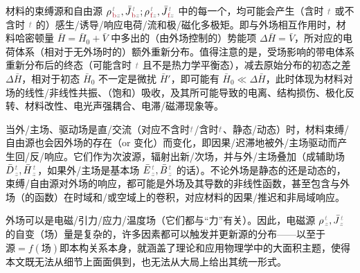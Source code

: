 材料的束缚源和自由源 ${\rho}^{\;\!\mathcolor{gray}{t}}_{\;\!\textcolor{Maroon}{\text{b}}\mathcolor{gray}{z}}, \bar{J}^{\;\!\mathcolor{gray}{t}}_{\;\!\textcolor{Maroon}{\text{b}}\mathcolor{gray}{z}};{\rho}^{\;\!\mathcolor{gray}{t}}_{\;\!\textcolor{Maroon}{\text{f}}\mathcolor{gray}{z}}, \bar{J}^{\;\!\mathcolor{gray}{t}}_{\;\!\textcolor{Maroon}{\text{f}}\mathcolor{gray}{z}}$ 中的每一个，均可能会产生（含时 $\mathcolor{gray}{t}$ 或不含时 $\mathcolor{gray}{t}$ 的）感生/诱导/响应电荷/流\cite{markelExternalInducedFree2018,raabMultipoleTheoryElectromagnetism2004,tsukermanPolarizationArbitraryCharge2021a}和极/磁化多极矩。即与外场相互作用时，材料哈密顿量 $\bar{H} = \bar{H}_0 + \bar{V}$ 中多出的（由外场控制的）势能项 $\Delta \bar{H} = \bar{V}$\cite{boydNonlinearOptics2019,raabMultipoleTheoryElectromagnetism2004}，所对应的电荷体系（相对于无外场时的）额外重新分布。值得注意的是，受场影响的带电体系重新分布后的终态（可能含时 $\mathcolor{gray}{t}$ 且不是热力学平衡态），减去原始分布的初态之差 $\Delta \bar{H}$，相对于初态 $\bar{H}_0$ 不一定是微扰 $\bar{H}'$\cite{boydNonlinearOptics2019}，即可能有 $\bar{H}_0 \ll \Delta \bar{H}$，此时体现为材料对场的线性/非线性共振、（饱和）吸收，及其所可能导致的电离\cite{boydNonlinearOptics2019}、结构损伤、极化反转、材料改性\cite{xuFemtosecondLaserWriting2022,weiExperimentalDemonstrationThreedimensional2018,xuThreedimensionalNonlinearPhotonic2018,keren-zurNewDimensionNonlinear2018}、电光声强耦合、电滞/磁滞现象等。

当外/主场、驱动场是直/交流（对应不含时$\mathcolor{gray}{t}$/含时$\mathcolor{gray}{t}$、静态/动态）时，材料束缚/自由源也会因外场的存在（or 变化）而变化，即因果/迟滞地被外/主场驱动而产生回/反/响应。它们作为次波源，辐射出新/次场，并与外/主场叠加（成辅助场 $\bar{D}^{\;\!\mathcolor{gray}{t}}_{\;\!\mathcolor{gray}{z}}, \bar{H}^{\;\!\mathcolor{gray}{t}}_{\;\!\mathcolor{gray}{z}}$，如果外/主场是基本场 $\bar{E}^{\;\!\mathcolor{gray}{t}}_{\;\!\mathcolor{gray}{z}}, \bar{B}^{\;\!\mathcolor{gray}{t}}_{\;\!\mathcolor{gray}{z}}$ 的话）。不论外场是静态的还是动态的，束缚/自由源对外场的响应，都可能是外场及其导数的非线性函数，甚至包含与外场（的函数）在时域和/或空域上的卷积，对应材料的因果/推迟和非局域响应。

外场可以是电磁/引力/应力/温度场（它们都与“力”有关）。因此，电磁源 ${\rho}^{\;\!\mathcolor{gray}{t}}_{\;\!\mathcolor{gray}{z}}, \bar{J}^{\;\!\mathcolor{gray}{t}}_{\;\!\mathcolor{gray}{z}}$ 的自变（场）量是复杂的，许多因素都可以触发并更新源的分布——以至于$\text{源} = f(\text{场})$即本构关系本身，就涵盖了理论和应用物理学中的大面积主题，使得本文既无法从细节上面面俱到，也无法从大局上给出其统一形式。

